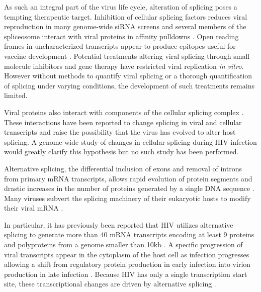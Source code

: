 \documentclass[../sherrill-Mix_thesis.tex]{subfiles}
\begin{document}
	As such an integral part of the virus life cycle\citep{Kim1989,Pomerantz1990}, alteration of splicing poses a tempting therapeutic target. Inhibition of cellular splicing factors reduces viral reproduction in many genome-wide siRNA screens \citep{Brass2008,Konig2008,Bushman2009} and several members of the spliceosome interact with viral proteins in affinity pulldowns \citep{Jager2012}. Open reading frames in uncharacterized transcripts appear to produce epitopes useful for vaccine development \citep{Bansal2010}. Potential treatments altering viral splicing through small molecule inhibitors \citep{Fukuhara2006,Bakkour2007} and gene therapy \citep{Asparuhova2007,Mandal2010} have restricted viral replication \emph{in vitro}. However without methods to quantify viral splicing or a thorough quantification of splicing under varying conditions, the development of such treatments remains limited. 

	Viral proteins also interact with components of the cellular splicing complex \citep{Tange1996,Berro2006,Jager2012}. These interactions have been reported to change splicing in viral\citep{Berro2006,Bohne2007,Jablonski2010} and cellular transcripts \citep{Kuramitsu2005,Hashizume2007} and raise the possibility that the virus has evolved to alter host splicing. A genome-wide study of changes in cellular splicing during HIV infection would greatly clarify this hypothesis but no such study has been performed. 

	Alternative splicing, the differential inclusion of exons and removal of introns from primary mRNA transcripts, allows rapid evolution of protein segments \citep{Kopelman2005,Xing2005,Su2006} and drastic increases in the number of proteins generated by a single DNA sequence \citep{Watson2005}. Many viruses subvert the splicing machinery of their eukaryotic hosts to modify their viral mRNA \citep{Pollard1998}. 

	In particular, it has previously been reported that HIV utilizes alternative splicing to generate more than 40 mRNA transcripts encoding at least 9 proteins and polyproteins from a genome smaller than 10kb \citep{Purcell1993}. A specific progression of viral transcripts appear in the cytoplasm of the host cell as infection progresses allowing a shift from regulatory protein production in early infection into virion production in late infection \citep{Kim1989,Pomerantz1990,Klotman1991}. Because HIV has only a single transcription start site, these transcriptional changes are driven by alternative splicing \citep{Stoltzfus2009}. 
\end{document}
